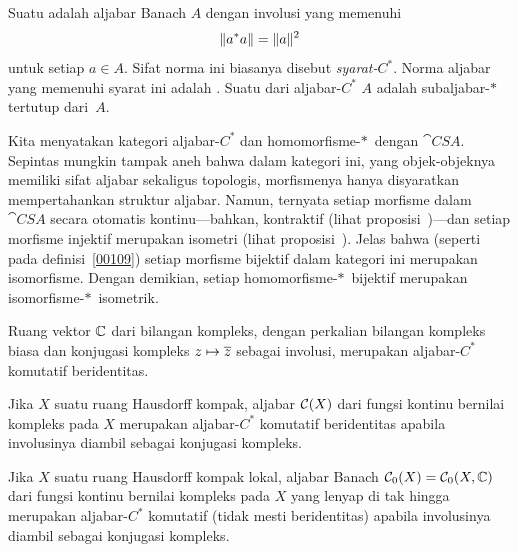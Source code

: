 \begin{defn}\label{0013} Suatu
 adalah aljabar Banach $A$ dengan involusi yang memenuhi
   \[ \lVert a^*a\rVert = \lVert a\rVert^2 \]
untuk setiap $a \in A$.  Sifat norma ini biasanya disebut
\emph{syarat-$C^*$}. Norma aljabar yang memenuhi syarat ini adalah
.  Suatu
 dari aljabar-$C^*$ $A$ adalah subaljabar-$*\,$ tertutup dari~$A$.

Kita menyatakan kategori aljabar-$C^*$ dan homomorfisme-$*\,$ dengan $\cat{CSA}$.
Sepintas mungkin tampak aneh bahwa dalam kategori ini, yang objek-objeknya memiliki sifat aljabar sekaligus topologis,
morfismenya hanya disyaratkan mempertahankan struktur aljabar. Namun, ternyata
setiap morfisme dalam $\cat{CSA}$ secara otomatis kontinu---bahkan, kontraktif (lihat
proposisi~)---dan
setiap morfisme injektif merupakan isometri (lihat proposisi~).  Jelas bahwa
(seperti pada definisi~\ref{00109}) setiap morfisme bijektif dalam kategori ini merupakan isomorfisme. Dengan demikian, setiap homomorfisme-$*\,$ bijektif
merupakan isomorfisme-$*\,$ isometrik.
\end{defn}

\begin{exam} Ruang vektor $\mathbb{C}$ dari bilangan kompleks, dengan perkalian bilangan kompleks biasa
dan konjugasi kompleks $z \mapsto \overline{z}$ sebagai involusi, merupakan aljabar-$C^*$
komutatif beridentitas.
\end{exam}

\begin{exam} Jika $X$ suatu ruang Hausdorff kompak, aljabar $\mathcal{C}(X)$ dari fungsi kontinu
bernilai kompleks pada $X$ merupakan aljabar-$C^*$ komutatif beridentitas apabila involusinya
diambil sebagai konjugasi kompleks.
\end{exam}

\begin{exam} Jika $X$ suatu ruang Hausdorff kompak lokal, aljabar Banach
$\mathcal{C}_0(X) = \mathcal{C}_0(X,\mathbb{C})$ dari fungsi kontinu bernilai kompleks pada $X$ yang lenyap
di tak hingga merupakan aljabar-$C^*$ komutatif (tidak mesti beridentitas) apabila involusinya
diambil sebagai konjugasi kompleks.
\end{exam}

